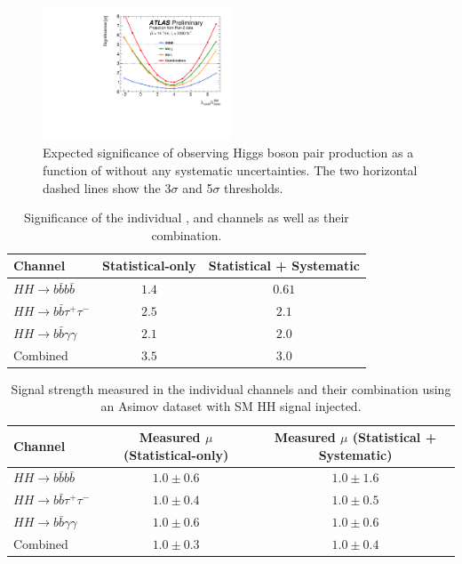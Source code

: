 \begin{figure}[htbp]
    \centering
    \includegraphics[width=0.5\textwidth]{Ch6/Img/figures_combination_bbbb_bbtt_bbyy_NoSyst_Significance_Preliminary.pdf}
    \caption{Expected significance of observing Higgs boson pair production as a function of \kl without any systematic uncertainties.  The two horizontal dashed lines show the 3$\sigma$ and 5$\sigma$ thresholds.} 
    \label{fig:HL-LHC:Comb:sig}
\end{figure}

\begin{table}[htbp]
    \centering
    \begin{tabular}{lcc}
\hline \hline
Channel & Statistical-only & Statistical + Systematic \\
\hline
$H H \rightarrow b \bar{b} b \bar{b}$ & $1.4$ & $0.61$ \\
$H H \rightarrow b \bar{b} \tau^{+} \tau^{-}$ & $2.5$ & $2.1$ \\
$H H \rightarrow b \bar{b} \gamma \gamma$ & $2.1$ & $2.0$ \\
\hline Combined & $3.5$ & $3.0$ \\
\hline \hline
\end{tabular}
    \caption{Significance of the individual \bbbb, \bbtt and \bbyy channels as well as their combination.}
    \label{tab:HL-LHC:Comb:sig}
\end{table}

\begin{table}[htbp]
    \centering
    \begin{tabular}{lcc}
\hline \hline 
Channel & Measured $\mu$ (Statistical-only) & Measured $\mu$ (Statistical + Systematic) \\
\hline
$H H \rightarrow b \bar{b} b \bar{b}$ & $1.0 \pm 0.6$ & $1.0 \pm 1.6$ \\
$H H \rightarrow b \bar{b} \tau^{+} \tau^{-}$ & $1.0 \pm 0.4$ & $1.0 \pm 0.5$ \\
$H H \rightarrow b \bar{b} \gamma \gamma$ & $1.0 \pm 0.6$ & $1.0 \pm 0.6$ \\
\hline Combined & $1.0 \pm 0.3$ & $1.0 \pm 0.4$ \\
\hline \hline
\end{tabular}
    \caption{Signal strength measured in the individual channels and their combination using an Asimov dataset with SM HH signal injected.}
    \label{tab:tab:HL-LHC:Comb:mu}
\end{table}

